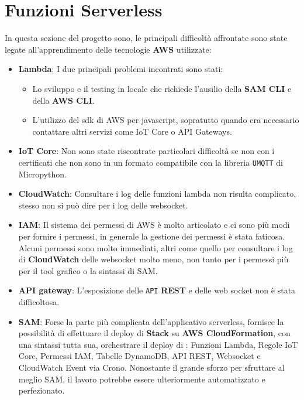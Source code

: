 \section{Funzioni Serverless}
    In questa sezione del progetto sono, le principali difficoltà   affrontate sono state legate all'apprendimento delle tecnologie \textbf{AWS} utilizzate:
    \begin{itemize}
        \item \textbf{Lambda}: I due principali problemi incontrati sono stati:
         \begin{itemize}
             \item Lo sviluppo e il testing in locale che richiede l'ausilio della \textbf{SAM CLI} e della \textbf{AWS CLI}.
             \item L'utilizzo del sdk di AWS per javascript, sopratutto quando era necessario contattare altri servizi come IoT Core o API Gateways.
         \end{itemize}
        \item \textbf{IoT Core}: Non sono state riscontrate particolari difficoltà se non con i certificati che non sono in un formato compatibile con la libreria \texttt{UMQTT} di Micropython.
        \item \textbf{CloudWatch}: Consultare i log delle funzioni lambda non risulta complicato, stesso non si può dire per i log delle websocket.
        \item \textbf{IAM}: Il sistema dei permessi di AWS è molto articolato e ci sono più modi per fornire i permessi, in generale la gestione dei permessi è stata faticosa. Alcuni permessi sono molto immediati, altri come quello per consultare i log di \textbf{CloudWatch} delle websocket molto meno, non tanto per i permessi più per il tool grafico o la sintassi di SAM.
        \item \textbf{API gateway}: L'esposizione delle \texttt{API} \textbf{REST} e delle web socket non è stata difficoltosa.
        \item \textbf{SAM}: Forse la parte più complicata dell'applicativo serverless, fornisce la possibilità di effettuare il deploy di \textbf{Stack} su \textbf{AWS CloudFormation}, con una sintassi tutta sua, orchestrare il deploy di : Funzioni Lambda, Regole IoT Core, Permessi IAM, Tabelle DynamoDB, API REST, Websocket e CloudWatch Event via Crono. Nonostante il grande sforzo per sfruttare al meglio SAM, il lavoro potrebbe essere ulteriormente automatizzato e perfezionato. 
    \end{itemize}
    
